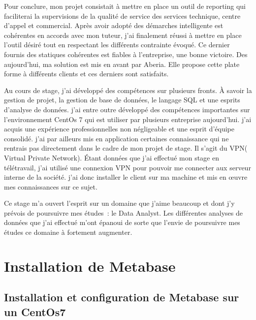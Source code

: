 \documentclass[a4paper,12pt]{report}
\begin{document}
        Pour conclure, mon projet consistait à mettre en place un outil de reporting qui faciliterai la supervisions de la qualité de service des services technique, centre d’appel et  commercial. Après avoir adopté des démarches intelligente est cohérentes en accords avec mon tuteur, j’ai finalement réussi à mettre en place l’outil désiré tout en respectant les différents contrainte évoqué. Ce dernier fournis des statiques cohérentes est fiables à l’entreprise, une bonne victoire. Des aujourd’hui, ma solution est mis en avant par Aberia. Elle propose cette plate forme à différents clients et ces derniers sont satisfaits.\newline\newline 
       
       Au cours de stage, j’ai développé des compétences sur plusieurs fronts. À savoir la gestion de projet, la gestion de base de données, le langage SQL  et une esprits d'analyse de données.
       j’ai entre outre développé des compétences importantes sur l'environnement CentOs 7 qui est utiliser par plusieurs entreprise aujourd’hui. j’ai acquis une expérience professionnelles non négligeable et une esprit d’équipe consolidé. j’ai par ailleurs mis en application certaines connaissance qui ne rentrais pas directement dans le cadre de mon projet de stage. Il s’agit du VPN( Virtual Private Network). Étant données que j’ai effectué mon stage en télétravail, j’ai utilisé une connexion VPN pour pouvoir me connecter aux serveur interne de la société. j’ai donc installer le client sur ma machine et mis en œuvre mes connaissances sur ce sujet.\newline\newline     
       
       
       Ce stage m’a ouvert l’esprit sur un domaine que j’aime beaucoup et dont j’y prévois de poursuivre mes études : le Data Analyst. Les différentes analyses de données que j’ai effectué m’ont épanoui de sorte que l’envie de poursuivre mes études ce domaine à fortement augmenter. 
\appendix
\chapter{Installation de Metabase}

\section*{Installation et configuration de Metabase sur un CentOs7}
\end{document}
